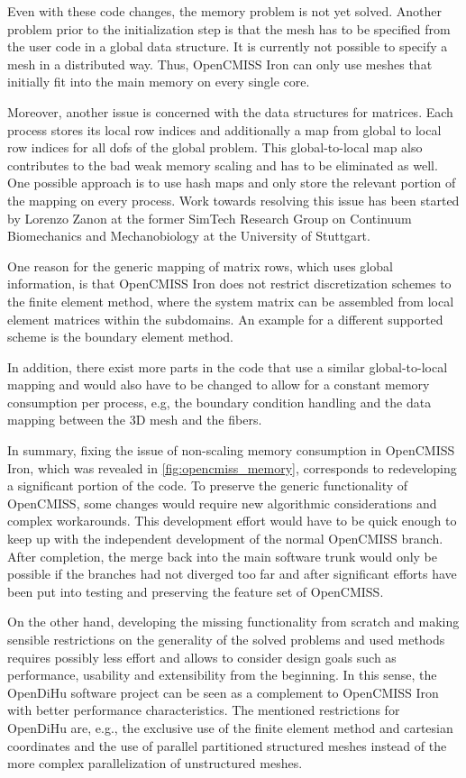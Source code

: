 Even with these code changes, the memory problem is not yet solved. Another problem prior to the initialization step is that the mesh has to be specified from the user code in a global data structure. It is currently not possible to specify a mesh in a distributed way. Thus, OpenCMISS Iron can only use meshes that initially fit into the main memory on every single core.

Moreover, another issue is concerned with the data structures for matrices. Each process stores its local row indices and additionally a map from global to local row indices for all dofs of the global problem. This global-to-local map also contributes to the bad weak memory scaling and has to be eliminated as well. One possible approach is to use hash maps and only store the relevant portion of the mapping on every process. Work towards resolving this issue has been started by Lorenzo Zanon at the former SimTech Research Group on Continuum Biomechanics and Mechanobiology at the University of Stuttgart. 

One reason for the generic mapping of matrix rows, which uses global information, is that OpenCMISS Iron does not restrict discretization schemes to the finite element method, where the system matrix can be assembled from local element matrices within the subdomains. An example for a different supported scheme is the boundary element method.

In addition, there exist more parts in the code that use a similar global-to-local mapping and would also have to be changed to allow for a constant memory consumption per process, e.g, the boundary condition handling and the data mapping between the 3D mesh and the fibers.

In summary, fixing the issue of non-scaling memory consumption in OpenCMISS Iron, which was revealed in \cref{fig:opencmiss_memory}, corresponds to redeveloping a significant portion of the code. 
To preserve the generic functionality of OpenCMISS, some changes would require new algorithmic considerations and complex workarounds.
This development effort would have to be quick enough to keep up with the independent development of the normal OpenCMISS branch. After completion, the merge back into the main software trunk would only be possible if the branches had not diverged too far and after significant efforts have been put into testing and preserving the feature set of OpenCMISS.

On the other hand, developing the missing functionality from scratch and making sensible restrictions on the generality of the solved problems and used methods requires possibly less effort and allows to consider design goals such as performance, usability and extensibility from the beginning.
In this sense, the OpenDiHu software project can be seen as a complement to OpenCMISS Iron with better performance characteristics.  %
The mentioned restrictions for OpenDiHu are, e.g., the exclusive use of the finite element method and cartesian coordinates and the use of parallel partitioned structured meshes instead of the more complex parallelization of unstructured meshes.

